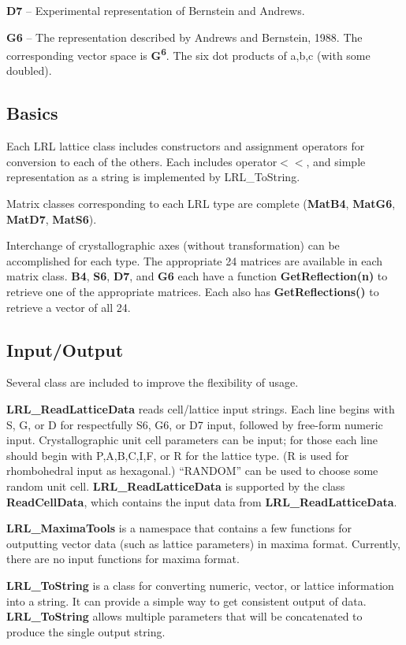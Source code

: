 \documentclass[11pt]{article} %
\begin{document}
\textbf{D7} – Experimental representation of Bernstein and Andrews.

\textbf{G6} – The representation described by Andrews and Bernstein, 1988. The corresponding vector space is \textbf{G\textsuperscript{6}}. The six dot products of a,b,c (with some doubled).


\subsection{Basics}

Each LRL lattice class includes constructors and assignment operators for conversion to each of the others. Each includes operator$<<$, and simple representation as a string is implemented by LRL\_ToString.

Matrix classes corresponding to each LRL type are complete (\textbf{MatB4}, \textbf{MatG6}, \textbf{MatD7}, \textbf{MatS6}).

Interchange of crystallographic axes (without transformation) can be accomplished for each type. The appropriate 24 matrices are available in each matrix class. \textbf{B4}, \textbf{S6}, \textbf{D7}, and \textbf{G6} each have a function \textbf{GetReflection(n)} to retrieve one of the appropriate matrices. Each also has \textbf{GetReflections()} to retrieve a vector of all 24.

\subsection{Input/Output}

Several class are included to improve the flexibility of usage. 

\textbf{LRL\_ReadLatticeData} reads cell/lattice input strings. Each line begins with S, G, or D for respectfully S6, G6, or D7 input, followed by free-form numeric input. Crystallographic unit cell parameters can be input; for those each line should begin with P,A,B,C,I,F, or R for the lattice type. (R is used for rhombohedral input as hexagonal.) ``RANDOM'' can be used to choose some random unit cell. \textbf{LRL\_ReadLatticeData} is supported by the class\textbf{ ReadCellData}, which contains the input data from \textbf{LRL\_ReadLatticeData}.

\textbf{LRL\_MaximaTools} is a namespace that contains a few functions for outputting vector data (such as lattice parameters) in maxima format. Currently, there are no input functions for maxima format.

\textbf{LRL\_ToString} is a class for converting numeric, vector, or lattice information into a string. It can provide a simple way to get consistent output of data. \textbf{LRL\_ToString}  allows multiple parameters that will be concatenated to produce the single output string.
\end{document}
